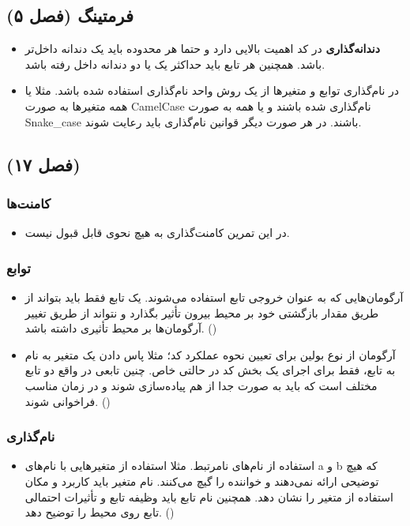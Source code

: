 \documentclass{utap}
\begin{document}
\subsection{فرمتینگ (فصل ۵)}
  \begin{itemize}
        \item
\textbf{دندانه‌گذاری}
در کد اهمیت بالایی دارد و حتما هر محدوده باید یک دندانه داخل‌تر باشد. همچنین هر تابع باید حداکثر یک یا دو دندانه داخل رفته باشد.
	\item
در نام‌گذاری توابع و متغیر‌ها از یک روش واحد نام‌گذاری استفاده شده باشد. مثلا یا همه متغیر‌ها به صورت CamelCase نام‌گذاری شده باشند و یا همه به صورت Snake\_case باشند. در هر صورت دیگر قوانین نام‌گذاری باید رعایت شوند.
    \end{itemize}


\subsection{ (فصل ۱۷)}

	\subsubsection{کامنت‌ها}
	  \begin{itemize}
	        \item در این تمرین کامنت‌گذاری به هیچ نحوی قابل قبول نیست.
	    \end{itemize}


	\subsubsection{توابع}
	  \begin{itemize}
	        \item
آرگومان‌هایی که به عنوان خروجی تابع استفاده می‌شوند. یک تابع فقط باید بتواند از طریق مقدار بازگشتی خود بر محیط بیرون تأثیر بگذارد و نتواند از طریق تغییر آرگومان‌ها بر محیط تأثیری داشته باشد. ()
		\item
آرگومان از نوع بولین برای تعیین نحوه عملکرد کد؛
مثلا پاس دادن یک متغیر به نام  به تابع، فقط برای اجرای یک بخش کد در حالتی خاص. چنین تابعی در واقع دو تابع مختلف است که باید به صورت جدا از هم پیاده‌سازی شوند و در زمان مناسب فراخوانی شوند. ()
	   \end{itemize}

	\subsubsection{نام‌گذاری}
	  \begin{itemize}
	        \item
استفاده از نام‌های نامرتبط. مثلا استفاده از متغیر‌هایی با نام‌های a و b که هیچ توضیحی ارائه نمی‌دهند و خواننده را گیچ می‌کنند. نام متغیر باید کاربرد و مکان استفاده از متغیر را نشان دهد. همچنین نام تابع باید وظیفه تابع و تأثیرات احتمالی تابع روی محیط را توضیح دهد. ()
	   \end{itemize}
\end{document}

